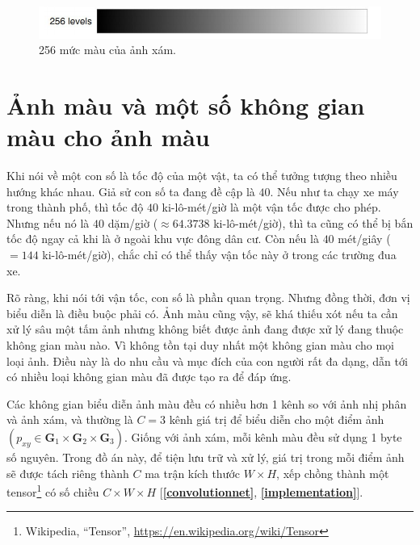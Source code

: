 \documentclass[a4paper, 12pt]{report}
\begin{document}
\begin{figure}[!h]
\captionsetup{width=0.8\textwidth}
\centering
\includegraphics[width=14cm]{images/grayscale.PNG}
\caption{256 mức màu của ảnh xám.}
\label{fig:grayscale}
\end{figure}

\section{Ảnh màu và một số không gian màu cho ảnh màu}\label{colorfulimage}

Khi nói về một con số là tốc độ của một vật, ta có thể tưởng tượng theo nhiều hướng khác nhau.
Giả sử con số ta đang đề cập là $40$.
Nếu như ta chạy xe máy trong thành phố, thì tốc độ $40$ ki-lô-mét/giờ là một vận tốc được cho phép.
Nhưng nếu nó là $40$ dặm/giờ ($\approx 64.3738$ ki-lô-mét/giờ), thì ta cũng có thể bị bắn tốc độ ngay cả khi là ở ngoài khu vực đông dân cư.
Còn nếu là $40$ mét/giây ($=144$ ki-lô-mét/giờ), chắc chỉ có thể thấy vận tốc này ở trong các trường đua xe.\vspace{5pt}

Rõ ràng, khi nói tới vận tốc, con số là phần quan trọng.
Nhưng đồng thời, đơn vị biểu diễn là điều buộc phải có.
Ảnh màu cũng vậy, sẽ khá thiếu xót nếu ta cần xử lý sâu một tấm ảnh nhưng không biết được ảnh đang được xử lý đang thuộc không gian màu nào.
Vì không tồn tại duy nhất một không gian màu \cite{wikicolorspace2021} cho mọi loại ảnh.
Điều này là do nhu cầu và mục đích của con người rất đa dạng, dẫn tới có nhiều loại không gian màu đã được tạo ra để đáp ứng.\vspace{5pt}

Các không gian biểu diễn ảnh màu đều có nhiều hơn 1 kênh so với ảnh nhị phân và ảnh xám, và thường là $C=3$ kênh giá trị để biểu diễn cho một điểm ảnh $\left(p_{xy} \in \bm{G}_{1}\times \bm{G}_{2}\times \bm{G}_{3}\right)$.
Giống với ảnh xám, mỗi kênh màu đều sử dụng 1 byte số nguyên.
Trong đồ án này, để tiện lưu trữ và xử lý, giá trị trong mỗi điểm ảnh sẽ được tách riêng thành $C$ ma trận kích thước $W\times H$, xếp chồng thành một tensor\footnote{Wikipedia, ``Tensor'', \href{https://en.wikipedia.org/wiki/Tensor}{https://en.wikipedia.org/wiki/Tensor}} có số chiều $C\times W \times H$ [\textbf{\ref{convolutionnet}}, \textbf{\ref{implementation}}].
\end{document}
